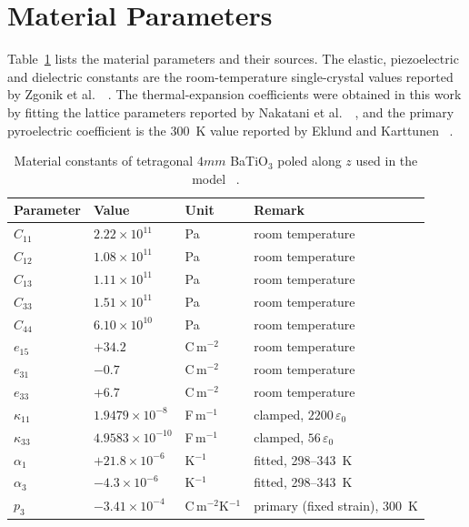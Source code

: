 \documentclass[a4paper,12pt]{elsarticle}
\begin{document}
\section{Material Parameters}
\label{sec:materials}

Table~\ref{tab:materials} lists the material parameters and their sources. The elastic,
piezoelectric and dielectric constants are the room-temperature single-crystal values
reported by Zgonik et al.\ ~\cite{Zgonik1994}. The thermal-expansion coefficients were
obtained in this work by fitting the lattice parameters reported by Nakatani et al.\
~\cite{Nakatani2016}, and the primary pyroelectric coefficient is the 300~K value
reported by Eklund and Karttunen ~\cite{EklundKarttunen2023}.

\begin{table}[t]
\centering
\small
\caption{Material constants of tetragonal $4mm$ BaTiO$_3$ poled along $z$ used in
the model ~\cite{Zgonik1994,Nakatani2016,EklundKarttunen2023}.}
\label{tab:materials}
\begin{tabular}{@{}llll@{}}
\toprule
Parameter & Value & Unit & Remark \\
\midrule
$C_{11}$ & $2.22\times10^{11}$ & Pa & room temperature \\
$C_{12}$ & $1.08\times10^{11}$ & Pa & room temperature \\
$C_{13}$ & $1.11\times10^{11}$ & Pa & room temperature \\
$C_{33}$ & $1.51\times10^{11}$ & Pa & room temperature \\
$C_{44}$ & $6.10\times10^{10}$ & Pa & room temperature \\
$e_{15}$ & $+34.2$ & C\,m$^{-2}$ & room temperature \\
$e_{31}$ & $-0.7$ & C\,m$^{-2}$ & room temperature \\
$e_{33}$ & $+6.7$ & C\,m$^{-2}$ & room temperature \\
$\kappa_{11}$ & $1.9479\times10^{-8}$ & F\,m$^{-1}$ & clamped, $2200\,\varepsilon_0$ \\
$\kappa_{33}$ & $4.9583\times10^{-10}$ & F\,m$^{-1}$ & clamped, $56\,\varepsilon_0$ \\
$\alpha_1$ & $+21.8\times10^{-6}$ & K$^{-1}$ & fitted, 298--343~K \\
$\alpha_3$ & $-4.3\times10^{-6}$ & K$^{-1}$ & fitted, 298--343~K \\
$p_3$ & $-3.41\times10^{-4}$ & C\,m$^{-2}$K$^{-1}$ & primary (fixed strain), 300~K \\
\bottomrule
\end{tabular}
\end{table}
\end{document}
